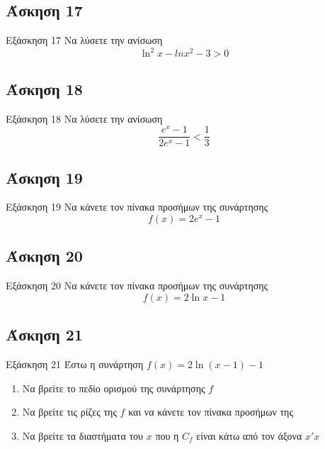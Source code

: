 \documentclass[greek]{beamer}
\begin{document}
\subsection{Άσκηση 17}
\begin{frame}[label=Άσκηση17,t]{Εξάσκηση 17}
 Να λύσετε την ανίσωση
 $$\ln^2x-ln x^2-3>0$$

\end{frame}

\subsection{Άσκηση 18}
\begin{frame}[label=Άσκηση18,t]{Εξάσκηση 18}
 Να λύσετε την ανίσωση $$\dfrac{e^x-1}{2e^x-1}<\dfrac{1}{3}$$

\end{frame}

\subsection{Άσκηση 19}
\begin{frame}[label=Άσκηση19,t]{Εξάσκηση 19}
 Να κάνετε τον πίνακα προσήμων της συνάρτησης $$f(x)=2e^x-1$$

\end{frame}

\subsection{Άσκηση 20}
\begin{frame}[label=Άσκηση20,t]{Εξάσκηση 20}
 Να κάνετε τον πίνακα προσήμων της συνάρτησης $$f(x)=2\ln x-1$$

\end{frame}

\subsection{Άσκηση 21}
\begin{frame}[label=Άσκηση21,t]{Εξάσκηση 21}
 Έστω η συνάρτηση $f(x)=2\ln (x-1)-1$
 \begin{enumerate}
  \item<1-> Να βρείτε το πεδίο ορισμού της συνάρτησης $f$
  \item<2-> Να βρείτε τις ρίζες της $f$ και να κάνετε τον πίνακα προσήμων της
  \item<3-> Να βρείτε τα διαστήματα του $x$ που η $C_f$ είναι κάτω από τον άξονα $x'x$
 \end{enumerate}

\end{frame}
\end{document}
